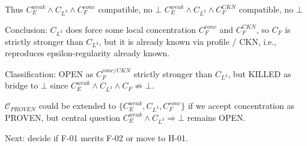 \documentclass[11pt]{article}
\begin{document}
Thus $\boxed{C_E^{weak}\land C_{L^3}\land C_F^{conc}\text{ compatible, no }\bot}$
$\boxed{C_E^{weak}\land C_{L^3}\land C_F^{CKN}\text{ compatible, no }\bot}$

Conclusion: $C_{L^3}$ does force some local concentration $C_F^{conc}$ and $C_F^{CKN}$, so $C_F$ is strictly stronger than $C_{L^3}$, but it is already known via profile / CKN, i.e., reproduces epsilon-regularity already known.

Classification: OPEN as $C_F^{conc/CKN}$ strictly stronger than $C_{L^3}$, but KILLED as bridge to $\bot$ since $C_E^{weak}\land C_{L^3}\land C_F\not\Rightarrow\bot$.

$\mathcal{C}_{PROVEN}$ could be extended to $\{C_E^{weak},C_{L^3},C_F^{conc}\}$ if we accept concentration as PROVEN, but central question $C_E^{weak}\land C_{L^3}\Rightarrow\bot$ remains OPEN.

Next: decide if F-01 merits F-02 or move to H-01.
\end{document}
